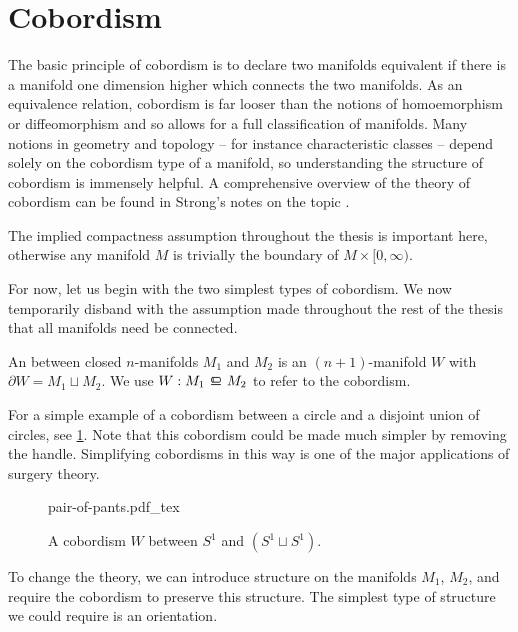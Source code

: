 \pagebreak
\section{Cobordism}\label{sec:cobordism}

The basic principle of cobordism is to declare two manifolds equivalent if there is a manifold one dimension higher which connects the two manifolds. As an equivalence relation, cobordism is far looser than the notions of homoemorphism or diffeomorphism and so allows for a full classification of manifolds. Many notions in geometry and topology -- for instance characteristic classes -- depend solely on the cobordism type of a manifold, so understanding the structure of cobordism is immensely helpful. 
A comprehensive overview of the theory of cobordism can be found in Strong's notes on the topic \cite{strong1968cobordism}.

\begin{remark}
	The implied compactness assumption throughout the thesis is important here, otherwise any manifold $M$ is trivially the boundary of $M\times [0,\infty)$. 
\end{remark}

For now, let us begin with the two simplest types of cobordism. We now temporarily disband with the assumption made throughout the rest of the thesis that all manifolds need be connected.

\begin{definition}
	An  between closed $n$-manifolds $M_1$ and $M_2$ is an $(n+1)$-manifold $W$ with $\partial W = M_1\sqcup M_2$. We use $W : M_1\bord M_2$ to refer to the cobordism.
\end{definition}

For a simple example of a cobordism between a circle and a disjoint union of circles, see \cref{fig:pair-of-pants}. Note that this cobordism could be made much simpler by removing the handle. Simplifying cobordisms in this way is one of the major applications of surgery theory.
\begin{figure}[ht]
	\centering
	{pair-of-pants.pdf_tex}
	\caption{A cobordism $W$ between $S^1$ and $(S^1\sqcup S^1)$.}\label{fig:pair-of-pants}
\end{figure}

To change the theory, we can introduce structure on the manifolds $M_1$, $M_2$, and require the cobordism to preserve this structure. The simplest type of structure we could require is an orientation.

